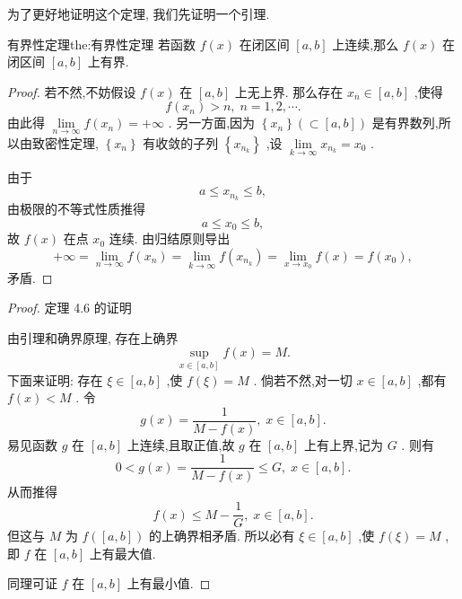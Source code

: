 为了更好地证明这个定理, 我们先证明一个引理.

\begin{theorem}{有界性定理}{the:有界性定理}
若函数 \(f\left( x\right)\) 在闭区间 \(\left\lbrack  {a,b}\right\rbrack\) 上连续,那么 \(f\left( x\right)\) 在闭区间 \(\left\lbrack  {a,b}\right\rbrack\) 上有界.
\end{theorem}

\begin{proof}
若不然,不妨假设 \(f\left( x\right)\) 在 \(\left\lbrack  {a,b}\right\rbrack\) 上无上界. 那么存在 \({x}_{n} \in  \left\lbrack  {a,b}\right\rbrack\) ,使得
\[
f\left( {x}_{n}\right)  > n,\;n = 1,2,\cdots .
\]
由此得 \(\mathop{\lim }\limits_{{n \rightarrow  \infty }}f\left( {x}_{n}\right)  =  + \infty\) . 另一方面,因为 \(\left\{  {x}_{n}\right\}  \left( { \subset  \left\lbrack  {a,b}\right\rbrack  }\right)\) 是有界数列,所以由致密性定理, \(\left\{  {x}_{n}\right\}\) 有收敛的子列 \(\left\{  {x}_{{n}_{k}}\right\}\) ,设 \(\mathop{\lim }\limits_{{k \rightarrow  \infty }}{x}_{{n}_{k}} = {x}_{0}\) .

由于
\[
a \leq  {x}_{{n}_{k}} \leq  b,
\]
由极限的不等式性质推得
\[
a \leq  {x}_{0} \leq  b,
\]
故 \(f\left( x\right)\) 在点 \({x}_{0}\) 连续. 由归结原则导出
\[
+ \infty  = \mathop{\lim }\limits_{{n \rightarrow  \infty }}f\left( {x}_{n}\right)  = \mathop{\lim }\limits_{{k \rightarrow  \infty }}f\left( {x}_{{n}_{k}}\right)  = \mathop{\lim }\limits_{{x \rightarrow  {x}_{0}}}f\left( x\right)  = f\left( {x}_{0}\right) ,
\]
矛盾.
\end{proof}

\begin{proof}
定理 4.6 的证明

由引理和确界原理, 存在上确界
\[
\mathop{\sup }\limits_{{x \in  \left\lbrack  {a,b}\right\rbrack  }}f\left( x\right)  = M.
\]
下面来证明: 存在 \(\xi  \in  \left\lbrack  {a,b}\right\rbrack\) ,使 \(f\left( \xi \right)  = M\) . 倘若不然,对一切 \(x \in  \left\lbrack  {a,b}\right\rbrack\) ,都有 \(f\left( x\right)  < M\) . 令
\[
g\left( x\right)  = \frac{1}{M - f\left( x\right) },\;x \in  \left\lbrack  {a,b}\right\rbrack  .
\]
易见函数 \(g\) 在 \(\left\lbrack  {a,b}\right\rbrack\) 上连续,且取正值,故 \(g\) 在 \(\left\lbrack  {a,b}\right\rbrack\) 上有上界,记为 \(G\) . 则有
\[
0 < g\left( x\right)  = \frac{1}{M - f\left( x\right) } \leq  G,\;x \in  \left\lbrack  {a,b}\right\rbrack  .
\]
从而推得
\[
f\left( x\right)  \leq  M - \frac{1}{G},\;x \in  \left\lbrack  {a,b}\right\rbrack  .
\]
但这与 \(M\) 为 \(f\left( \left\lbrack  {a,b}\right\rbrack  \right)\) 的上确界相矛盾. 所以必有 \(\xi  \in  \left\lbrack  {a,b}\right\rbrack\) ,使 \(f\left( \xi \right)  = M\) ,即 \(f\) 在 \(\left\lbrack  {a,b}\right\rbrack\) 上有最大值.

同理可证 \(f\) 在 \(\left\lbrack  {a,b}\right\rbrack\) 上有最小值.
\end{proof}


